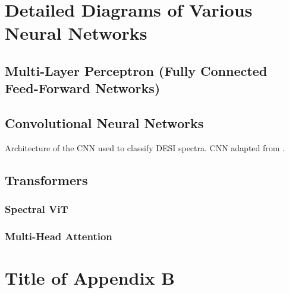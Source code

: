 \chapter{Detailed Diagrams of Various Neural Networks}
\label{chap:NNArch}
\section{Multi-Layer Perceptron (Fully Connected Feed-Forward Networks)}
\label{app:MLP}


\section{Convolutional Neural Networks}
\label{app:CNN}

\begin{table}
    \centering
    \sffamily
    \resizebox{\linewidth}{!}{}
    \caption{Architecture of the CNN used to classify DESI spectra. CNN adapted 
from \textcite{Sepeku2022}.} 
    \label{tab:cnn_architecture}
\end{table}

\section{Transformers}
\label{app:transformer}

\subsection{Spectral ViT}
\label{app:SpecViT}

\subsection{Multi-Head Attention}
\label{app:MHA}


\chapter{Title of Appendix B}

